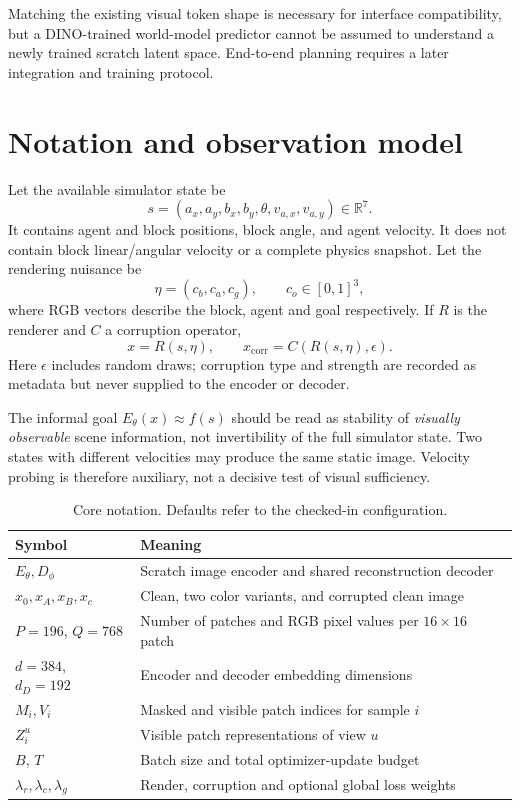 \documentclass[11pt,a4paper]{article}
\newcommand{\R}{\mathbb{R}}
\begin{document}
Matching the existing visual token shape is necessary for interface compatibility,
but a DINO-trained world-model predictor cannot be assumed to understand a newly
trained scratch latent space. End-to-end planning requires a later integration
and training protocol.

\section{Notation and observation model}
Let the available simulator state be
\begin{equation}
s=(a_x,a_y,b_x,b_y,\theta,v_{a,x},v_{a,y})\in\R^7.
\end{equation}
It contains agent and block positions, block angle, and agent velocity.
It does not contain block linear/angular velocity or a complete physics snapshot.
Let the rendering nuisance be
\begin{equation}
\eta=(c_b,c_a,c_g),\qquad c_o\in[0,1]^3,
\end{equation}
where RGB vectors describe the block, agent and goal respectively. If $R$ is the
renderer and $C$ a corruption operator,
\begin{equation}
x=R(s,\eta),\qquad x_{\mathrm{corr}}=C(R(s,\eta),\epsilon).
\end{equation}
Here $\epsilon$ includes random draws; corruption type and strength are recorded
as metadata but never supplied to the encoder or decoder.

The informal goal $E_\theta(x)\approx f(s)$ should be read as stability of
\emph{visually observable} scene information, not invertibility of the full
simulator state. Two states with different velocities may produce the same static
image. Velocity probing is therefore auxiliary, not a decisive test of visual sufficiency.

\begin{table}[htbp]\centering\small
\begin{tabularx}{\linewidth}{lX}
\toprule Symbol & Meaning \\\midrule
$E_\theta,D_\phi$ & Scratch image encoder and shared reconstruction decoder \\
$x_0,x_A,x_B,x_c$ & Clean, two color variants, and corrupted clean image \\
$P=196$, $Q=768$ & Number of patches and RGB pixel values per $16\times16$ patch \\
$d=384$, $d_D=192$ & Encoder and decoder embedding dimensions \\
$M_i,V_i$ & Masked and visible patch indices for sample $i$ \\
$Z_i^u$ & Visible patch representations of view $u$ \\
$B$, $T$ & Batch size and total optimizer-update budget \\
$\lambda_r,\lambda_c,\lambda_g$ & Render, corruption and optional global loss weights \\
\bottomrule
\end{tabularx}
\caption{Core notation. Defaults refer to the checked-in configuration.}
\end{table}
\end{document}
